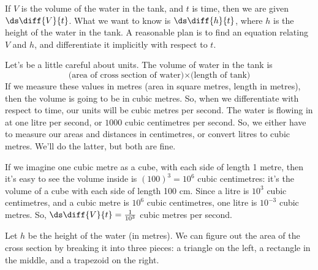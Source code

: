 \begin{solution}
If $V$ is the volume of the water in the tank, and $t$ is time, then we are given $\ds\diff{V}{t}$. What we want to know is $\ds\diff{h}{t}$, where $h$ is the height of the water in the tank. A reasonable plan is to find an equation relating $V$ and $h$, and differentiate it implicitly with respect to $t$.

Let's be a little careful about units.
The volume of water in the tank is
\[\text{(area of cross section of water)$\times$(length of tank)}\] If we measure these values in metres (area in square metres, length in metres), then the volume is going to be in cubic metres. So, when we differentiate with respect to time, our units will be cubic metres per second. The water is flowing in at one litre per second, or $1000$ cubic centimetres per second. So, we either have to measure our areas and distances in centimetres, or convert litres to cubic metres. We'll do the latter, but both are fine.

 If we imagine one cubic metre as a cube, with each side of length 1 metre, then it's easy to see the volume inside is $(100)^3=10^6$ cubic centimetres: it's the volume of a cube with each side of length 100 cm. Since a litre is $10^3$ cubic centimetres, and a cubic metre is $10^{6}$ cubic centimetres, one litre is $10^{-3}$ cubic metres.
So, \textcolor{red}{$\ds\diff{V}{t}=\frac{1}{10^3}$} cubic metres per second.

Let $h$ be the height of the water (in metres). We can figure out the area of the cross section by breaking it into three pieces: a triangle on the left, a rectangle in the middle, and a trapezoid on the right.

\begin{center}
\end{center}


\end{solution}

